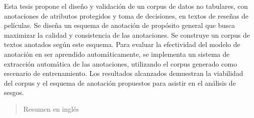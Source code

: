 \begin{resumen}
	Esta tesis propone el dise\~no y validaci\'on de un corpus de datos no tabulares, con anotaciones de atributos protegidos y toma de decisiones, 
	en textos de rese\~nas de pel\'iculas. Se dise\~na un esquema de anotaci\'on de prop\'osito general que busca maximizar la calidad y consistencia de las 
	anotaciones. Se construye un corpus de textos anotados seg\'un este esquema. Para evaluar la efectividad del modelo de anotaci\'on en ser 
	aprendido autom\'aticamente, se implementa un sistema de extracci\'on autom\'atica de las anotaciones, utilizando el corpus generado como 
	escenario de entrenamiento. Los resultados alcanzados demuestran la viabilidad del corpus y el esquema de anotaci\'on propuestos para asistir 
	en el an\'alisis de sesgos.



\end{resumen}

\begin{abstract}
	Resumen en inglés
\end{abstract}